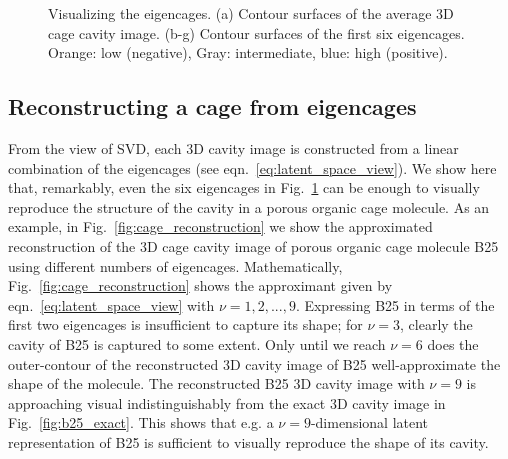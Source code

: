 \documentclass[journal=jacsat,manuscript=article,layout=traditional]{achemso}
\begin{document}
\begin{figure}
		\qquad
	\caption{Visualizing the eigencages. (a) Contour surfaces of the average 3D cage cavity image. (b-g) Contour surfaces of the first six eigencages. Orange: low (negative), Gray: intermediate, blue: high (positive).
	} \label{fig:eigencages}
\end{figure}

\subsection{Reconstructing a cage from eigencages} From the view of SVD, each 3D cavity image is constructed from a linear combination of the eigencages (see eqn.~\ref{eq:latent_space_view}). We show here that, remarkably, even the six eigencages in Fig.~\ref{fig:eigencages} can be enough to visually reproduce the structure of the cavity in a porous organic cage molecule. As an example, in Fig.~\ref{fig:cage_reconstruction} we show the approximated reconstruction of the 3D cage cavity image of porous organic cage molecule B25 using different numbers of eigencages. Mathematically, Fig.~\ref{fig:cage_reconstruction} shows the approximant given by eqn.~\ref{eq:latent_space_view} with $\nu=1,2,...,9$. Expressing B25 in terms of the first two eigencages is insufficient to capture its shape; for $\nu=3$, clearly the cavity of B25 is captured to some extent. Only until we reach $\nu=6$ does the outer-contour of the reconstructed 3D cavity image of B25 well-approximate the shape of the molecule. The reconstructed B25 3D cavity image with $\nu=9$ is approaching visual indistinguishably from the exact 3D cavity image in Fig.~\ref{fig:b25_exact}. This shows that e.g. a $\nu=9$-dimensional latent representation of B25 is sufficient to visually reproduce the shape of its cavity.
\end{document}
